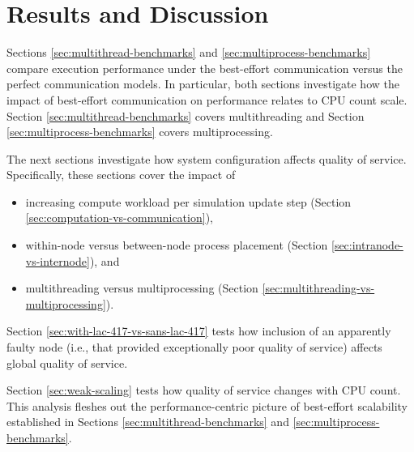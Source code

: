 \section{Results and Discussion}

Sections \ref{sec:multithread-benchmarks} and \ref{sec:multiprocess-benchmarks} compare execution performance under the best-effort communication versus the perfect communication models.
In particular, both sections investigate how the impact of best-effort communication on performance relates to CPU count scale.
Section \ref{sec:multithread-benchmarks} covers multithreading and Section \ref{sec:multiprocess-benchmarks} covers multiprocessing.

The next sections investigate how system configuration affects quality of service.
Specifically, these sections cover the impact of
\begin{itemize}
  \item increasing compute workload per simulation update step (Section \ref{sec:computation-vs-communication}),
  \item within-node versus between-node process placement (Section \ref{sec:intranode-vs-internode}), and
  \item multithreading versus multiprocessing (Section \ref{sec:multithreading-vs-multiprocessing}).
\end{itemize}

Section \ref{sec:with-lac-417-vs-sans-lac-417} tests how inclusion of an apparently faulty node (i.e., that provided exceptionally poor quality of service) affects global quality of service.

Section \ref{sec:weak-scaling} tests how quality of service changes with CPU count.
This analysis fleshes out the performance-centric picture of best-effort scalability established in Sections \ref{sec:multithread-benchmarks} and \ref{sec:multiprocess-benchmarks}.














